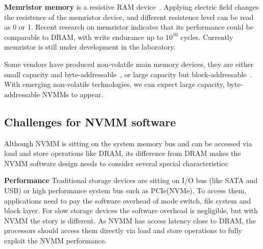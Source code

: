 \textbf{Memristor memory} is a resistive RAM device~\cite{memristor}.
Applying electric field
changes the resistence of the memristor device, and different resistence level
can be read as 0 or 1. Recent research on memristor indicates that its
performance could be comparable to DRAM, with write endurance up to $10^{10}$
cycles. Currently memristor is still under development in the laboratory.
 
Some vendors have produced non-volatile main memory devices, they are
either small capacity and byte-addressable~\cite{micron-nvdimm},
or large capacity but block-addressable~\cite{smart-system}.
With emerging non-volatile technologies, we can expect
large capacity, byte-addressable NVMMs to appear.

\begin{table}
	\vspace*{1mm}
	\caption{}
	\label{table:techtrend}
\end{table}

\subsection{Challenges for NVMM software}
\label{sec:challenge}

Although NVMM is sitting on the system memory bus and can be accessed
via load and store operations like DRAM, its difference from DRAM
makes the NVMM software design needs to consider several special
characteristics:

\textbf{Performance} Traditional storage devices are sitting on I/O bus
(like SATA and USB) or high performance system bus such as PCIe(NVMe). To access
them, applications need to pay the software overhead of mode switch, 
file system and
block layer. For slow storage devices the software overhead is negligible,
but with NVMM the story is different. As NVMM has access latency close to
DRAM, the processors should access them directly via load and store
operations to fully exploit the NVMM performance.

